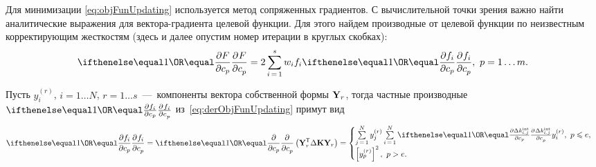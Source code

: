Для минимизации \eqref{eq:objFunUpdating} используется метод сопряженных градиентов. С вычислительной точки зрения важно найти аналитические выражения для вектора-градиента целевой функции. Для этого найдем производные от целевой функции по неизвестным корректирующим жесткостям (здесь и далее опустим номер итерации в круглых скобках):
\begin{equation}
	\partDer{F}{c_p}{} = 2 \sum\limits_{i\,=\,1} ^ s w_i f_i \partDer{f_i}{c_p}{}, \ p = 1 \hdots m.
	\label{eq:derObjFunUpdating}
\end{equation}

Пусть $ y_i ^ {(r)} $, $ i = 1 \hdots N $, $ r = 1 \hdots s $~---~компоненты вектора собственной формы $ \mathbf{Y}_r $, тогда частные производные $ \partDer{f_i}{c_p}{} $ из~\eqref{eq:derObjFunUpdating} примут вид
\begin{equation}
	\partDer{f_i}{c_p}{} = \partDer{}{c_p}{} \rbrackets{\trans{\mat{Y}_r} \Delta \mat{K} \mat{Y}_r} =
	\begin{cases}
		\sum\limits_{j\,=\,1} ^ N y_j ^ {(r)} \sum \limits_{i\,=\,1} ^ N \partDer{\Delta \internal{k}_{i, j}}{c_p}{} y_i ^{(r)},\ p \leq e, \\
		\sbrackets{y_p ^ {(r)}} ^ 2,\ p > e.
	\end{cases}
	\label{eq:derResidualUpdating}
\end{equation}

